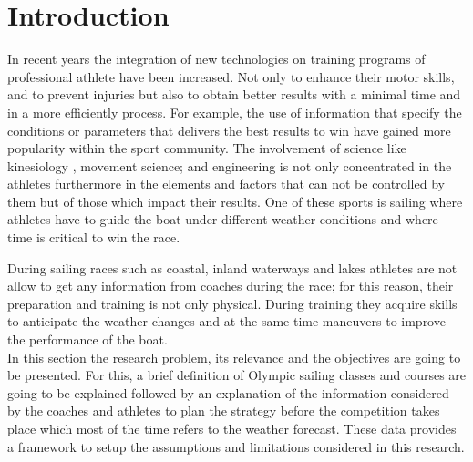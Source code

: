 \chapter{Introduction}


In recent years the integration of new technologies on training programs of professional athlete have been increased. Not only to enhance their motor skills, and to prevent injuries but also to obtain better results with a minimal time and in a more efficiently process. For example, the use of information that specify the conditions or parameters that delivers the best results to win have gained more popularity within the sport community. The involvement of science like kinesiology \cite{sjogaard2015science}, movement science; and engineering is not only concentrated in the athletes furthermore in the elements and factors that can not be controlled by them but of those which impact their results. One of these sports is sailing where athletes have to guide the boat under different weather conditions and where time is critical to win the race.\newline

During sailing races such as coastal, inland waterways and lakes athletes are not allow to get any information from coaches during the race; for this reason, their preparation and training is not only physical. During training they acquire skills to anticipate the weather changes and at the same time maneuvers to improve the performance of the boat. \\

In this section the research problem, its relevance and the objectives are going to be presented. For this, a brief definition of Olympic sailing classes and courses are going to be explained followed by an explanation of the information considered by the coaches and athletes to plan the strategy before the competition takes place which most of the time refers to the weather forecast. These data provides a framework to setup the assumptions and limitations considered in this research.
\\

